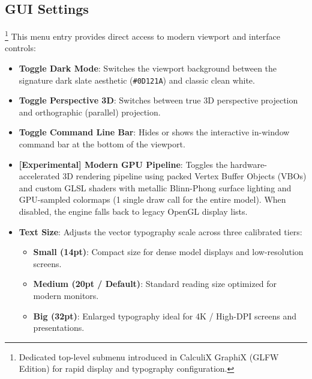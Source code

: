 \documentclass{article}
\begin{document}
\subsection{\label{GUI Settings}GUI Settings}
\footnote{Dedicated top-level submenu introduced in CalculiX GraphiX (GLFW Edition) for rapid display and typography configuration.}
This menu entry provides direct access to modern viewport and interface controls:
\begin{itemize}
\item \textbf{Toggle Dark Mode}: Switches the viewport background between the signature dark slate aesthetic (\texttt{\#0D121A}) and classic clean white.
\item \textbf{Toggle Perspective 3D}: Switches between true 3D perspective projection and orthographic (parallel) projection.
\item \textbf{Toggle Command Line Bar}: Hides or shows the interactive in-window command bar at the bottom of the viewport.
\item \textbf{[Experimental] Modern GPU Pipeline}: Toggles the hardware-accelerated 3D rendering pipeline using packed Vertex Buffer Objects (VBOs) and custom GLSL shaders with metallic Blinn-Phong surface lighting and GPU-sampled colormaps (1 single draw call for the entire model). When disabled, the engine falls back to legacy OpenGL display lists.
\item \textbf{Text Size}: Adjusts the vector typography scale across three calibrated tiers:
  \begin{itemize}
  \item \textbf{Small (14pt)}: Compact size for dense model displays and low-resolution screens.
  \item \textbf{Medium (20pt / Default)}: Standard reading size optimized for modern monitors.
  \item \textbf{Big (32pt)}: Enlarged typography ideal for 4K / High-DPI screens and presentations.
  \end{itemize}
\end{itemize}
\end{document}
